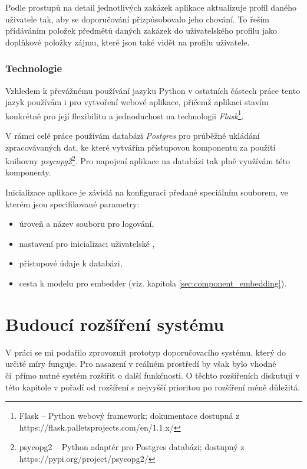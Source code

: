 \documentclass[thesis=M,czech]{FITthesis}[2019/12/23]
\begin{document}
Podle prostupů na detail jednotlivých zakázek aplikace aktualizuje profil daného uživatele tak, aby se doporučování přizpůsobovalo jeho chování. To řeším přidáváním položek předmětů daných zakázek do uživatelského profilu jako doplňkové položky zájmu, které jsou také vidět na profilu uživatele.

\subsection{Technologie}

Vzhledem k převážnému používání jazyku Python v ostatních částech práce tento jazyk používám i pro vytvoření webové aplikace, přičemž aplikaci stavím konkrétně pro její flexibilitu a jednoduchost na technologii \textit{Flask}\footnote{Flask -- Python webový framework;\newline
dokumentace dostupná z https://flask.palletsprojects.com/en/1.1.x/}.

V rámci celé práce používám databázi \textit{Postgres} pro průběžné ukládání zpracovávaných dat, ke které vytvářím přístupovou komponentu za použití knihovny \textit{psycopg2}\footnote{psycopg2 -- Python adaptér pro Postgres databázi;\newline
dostupný z https://pypi.org/project/psycopg2/}. Pro napojení aplikace na databázi tak plně využívám této komponenty.

Inicializace aplikace je závislá na konfiguraci předané speciálním souborem, ve kterém jsou specifikované parametry:
\begin{itemize}
    \item úroveň a název souboru pro logování,
    \item nastavení pro inicializaci uživatelské ,
    \item přístupové údaje k databázi,
    \item cesta k modelu pro embedder (viz. kapitola \ref{sec:component_embedding}).
\end{itemize}


\chapter{Budoucí rozšíření systému}

V práci se mi podařilo zprovoznit prototyp doporučovacího systému, který do určité míry funguje. Pro nasazení v reálném prostředí by však bylo vhodné či~přímo nutné systém rozšířit o další funkčnosti. O těchto rozšířeních diskutuji v této kapitole v pořadí od rozšíření s nejvyšší prioritou po rozšíření méně důležitá.
\end{document}
